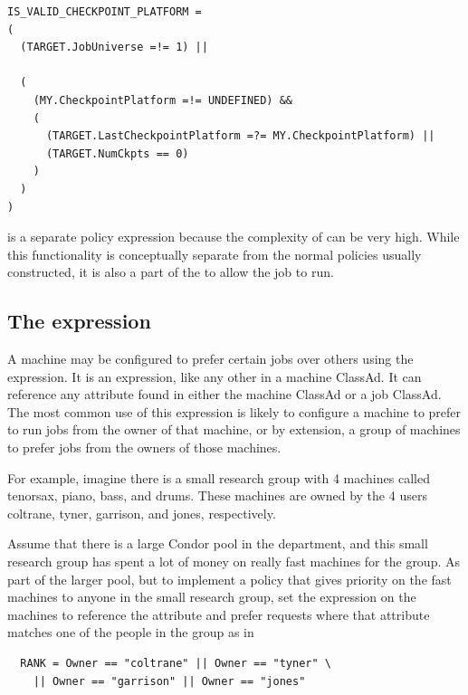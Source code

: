 \footnotesize
\begin{verbatim}
IS_VALID_CHECKPOINT_PLATFORM = 
(
  (TARGET.JobUniverse =!= 1) ||

  (
    (MY.CheckpointPlatform =!= UNDEFINED) &&
    (
      (TARGET.LastCheckpointPlatform =?= MY.CheckpointPlatform) ||
      (TARGET.NumCkpts == 0)
    )
  )
)
\end{verbatim}
\normalsize

is a separate policy expression because the complexity of
 can be very high.
While this
functionality is conceptually separate from the normal 
policies usually constructed, it is also a part of the 
to allow the job to run.

\subsection{\label{sec:Rank-Expression}
The  expression}

A machine may be configured to prefer certain jobs over others
using the  expression.
It is an
expression, like any other in a machine ClassAd.
It can
reference any attribute found in either the machine ClassAd or a job ClassAd.
The most common use of this expression is likely to configure a
machine to prefer to run jobs from the owner of that machine, or by
extension, a group of machines to prefer jobs from the owners of those
machines.

For example, imagine there is a small research group with 4 machines
called tenorsax, piano, bass, and drums.
These machines are owned by the 4 users
coltrane, tyner, garrison, and jones,
respectively.  

Assume that there is a large Condor pool in the department,
and this small research group has spent a lot of money on really fast machines 
for the group.
As part of the larger pool, 
but to implement a policy that gives priority on the fast machines to
anyone in the small research group,
set the 
expression on the machines to reference the  attribute and
prefer requests where that attribute matches one of the people in the
group as in
\begin{verbatim}
  RANK = Owner == "coltrane" || Owner == "tyner" \
    || Owner == "garrison" || Owner == "jones"
\end{verbatim}

